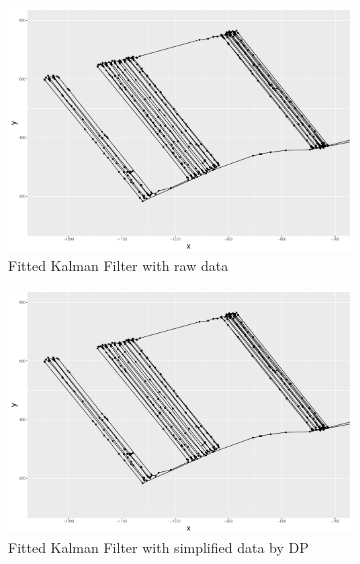 \begin{figure}[h]
\centering
\begin{subfigure}[t]{0.47\textwidth}
\includegraphics[width=\linewidth]{Chapters/06Spinoff/plot/ggRawKF.pdf}
\caption{Fitted Kalman Filter with raw data}
\end{subfigure}
 \begin{subfigure}[t]{0.47\textwidth}
\includegraphics[width=\linewidth]{Chapters/06Spinoff/plot/ggDPKF.pdf}
\caption{Fitted Kalman Filter with simplified data by DP}
\end{subfigure}
 \begin{subfigure}[t]{0.47\textwidth}

\end{subfigure}
\end{figure}
